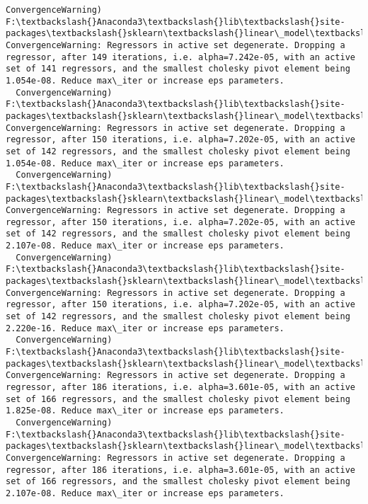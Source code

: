 \documentclass[11pt]{article}
\begin{document}
\begin{Verbatim}[commandchars=\\\{\}]
  ConvergenceWarning)
F:\textbackslash{}Anaconda3\textbackslash{}lib\textbackslash{}site-packages\textbackslash{}sklearn\textbackslash{}linear\_model\textbackslash{}least\_angle.py:313: ConvergenceWarning: Regressors in active set degenerate. Dropping a regressor, after 149 iterations, i.e. alpha=7.242e-05, with an active set of 141 regressors, and the smallest cholesky pivot element being 1.054e-08. Reduce max\_iter or increase eps parameters.
  ConvergenceWarning)
F:\textbackslash{}Anaconda3\textbackslash{}lib\textbackslash{}site-packages\textbackslash{}sklearn\textbackslash{}linear\_model\textbackslash{}least\_angle.py:313: ConvergenceWarning: Regressors in active set degenerate. Dropping a regressor, after 150 iterations, i.e. alpha=7.202e-05, with an active set of 142 regressors, and the smallest cholesky pivot element being 1.054e-08. Reduce max\_iter or increase eps parameters.
  ConvergenceWarning)
F:\textbackslash{}Anaconda3\textbackslash{}lib\textbackslash{}site-packages\textbackslash{}sklearn\textbackslash{}linear\_model\textbackslash{}least\_angle.py:313: ConvergenceWarning: Regressors in active set degenerate. Dropping a regressor, after 150 iterations, i.e. alpha=7.202e-05, with an active set of 142 regressors, and the smallest cholesky pivot element being 2.107e-08. Reduce max\_iter or increase eps parameters.
  ConvergenceWarning)
F:\textbackslash{}Anaconda3\textbackslash{}lib\textbackslash{}site-packages\textbackslash{}sklearn\textbackslash{}linear\_model\textbackslash{}least\_angle.py:313: ConvergenceWarning: Regressors in active set degenerate. Dropping a regressor, after 150 iterations, i.e. alpha=7.202e-05, with an active set of 142 regressors, and the smallest cholesky pivot element being 2.220e-16. Reduce max\_iter or increase eps parameters.
  ConvergenceWarning)
F:\textbackslash{}Anaconda3\textbackslash{}lib\textbackslash{}site-packages\textbackslash{}sklearn\textbackslash{}linear\_model\textbackslash{}least\_angle.py:313: ConvergenceWarning: Regressors in active set degenerate. Dropping a regressor, after 186 iterations, i.e. alpha=3.601e-05, with an active set of 166 regressors, and the smallest cholesky pivot element being 1.825e-08. Reduce max\_iter or increase eps parameters.
  ConvergenceWarning)
F:\textbackslash{}Anaconda3\textbackslash{}lib\textbackslash{}site-packages\textbackslash{}sklearn\textbackslash{}linear\_model\textbackslash{}least\_angle.py:313: ConvergenceWarning: Regressors in active set degenerate. Dropping a regressor, after 186 iterations, i.e. alpha=3.601e-05, with an active set of 166 regressors, and the smallest cholesky pivot element being 2.107e-08. Reduce max\_iter or increase eps parameters.

\end{Verbatim}
\end{document}
